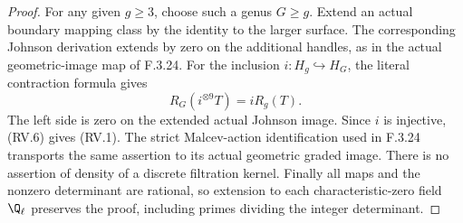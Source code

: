 \begin{proof}
For any given $g\geq3$, choose such a genus $G\geq g$.
Extend an actual boundary mapping class by the identity
to the larger surface. The corresponding Johnson
derivation extends by zero on the additional handles,
as in the actual geometric-image map of F.3.24.
For the inclusion $i:H_g\hookrightarrow H_G$, the
literal contraction formula gives
\[
                       R_G(i^{\otimes9}T)=iR_g(T).
                                                               \tag{RV.6}
\]
The left side is zero on the extended actual Johnson
image. Since $i$ is injective, (RV.6) gives (RV.1).
The strict Malcev-action identification used in F.3.24
transports the same assertion to its actual geometric
graded image. There is no assertion of density of a
discrete filtration kernel. Finally all maps and the
nonzero determinant are rational, so extension to
each characteristic-zero field $\Q_\ell$ preserves
the proof, including primes dividing the integer
determinant.
\end{proof}



